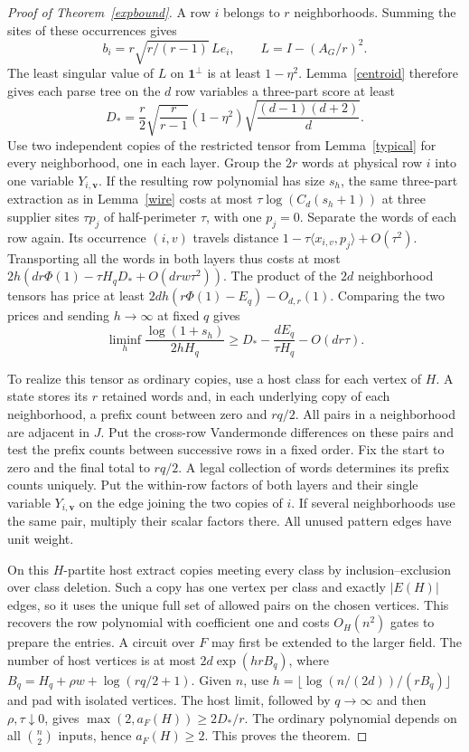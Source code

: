 \documentclass[11pt]{article}
\theoremstyle{remark}
\begin{document}
\begin{proof}[Proof of Theorem~\ref{expbound}]
A row $i$ belongs to $r$ neighborhoods. Summing the sites of these occurrences gives
\[
 b_i=r\sqrt{r/(r-1)}\,L e_i,\qquad L=I-(A_G/r)^2.
\]
The least singular value of $L$ on $\mathbf1^\perp$ is at least $1-\eta^2$. Lemma~\ref{centroid} therefore gives each parse tree on the $d$ row variables a three-part score at least
\[
 D_* = \frac r2\sqrt{\frac r{r-1}}(1-\eta^2)
                      \sqrt{\frac{(d-1)(d+2)}d}.
\]
Use two independent copies of the restricted tensor from Lemma~\ref{typical} for every neighborhood, one in each layer. Group the $2r$ words at physical row $i$ into one variable $Y_{i,\boldsymbol v}$. If the resulting row polynomial has size $s_h$, the same three-part extraction as in Lemma~\ref{wire} costs at most $\tau\log(C_d(s_h+1))$ at three supplier sites $\tau p_j$ of half-perimeter $\tau$, with one $p_j=0$. Separate the words of each row again. Its occurrence $(i,v)$ travels distance $1-\tau\langle x_{i,v},p_j\rangle+O(\tau^2)$. Transporting all the words in both layers thus costs at most $2h(dr\Phi(1)-\tau H_qD_*+O(dr w\tau^2))$. The product of the $2d$ neighborhood tensors has price at least $2dh(r\Phi(1)-E_q)-O_{d,r}(1)$. Comparing the two prices and sending $h\to\infty$ at fixed $q$ gives
\[
 \liminf_h\frac{\log(1+s_h)}{2hH_q}
       \ge D_*-\frac{dE_q}{\tau H_q}-O(dr\tau).
\]

To realize this tensor as ordinary copies, use a host class for each vertex of $H$. A state stores its $r$ retained words and, in each underlying copy of each neighborhood, a prefix count between zero and $rq/2$. All pairs in a neighborhood are adjacent in $J$. Put the cross-row Vandermonde differences on these pairs and test the prefix counts between successive rows in a fixed order. Fix the start to zero and the final total to $rq/2$. A legal collection of words determines its prefix counts uniquely. Put the within-row factors of both layers and their single variable $Y_{i,\boldsymbol v}$ on the edge joining the two copies of $i$. If several neighborhoods use the same pair, multiply their scalar factors there. All unused pattern edges have unit weight.

On this $H$-partite host extract copies meeting every class by inclusion--exclusion over class deletion. Such a copy has one vertex per class and exactly $|E(H)|$ edges, so it uses the unique full set of allowed pairs on the chosen vertices. This recovers the row polynomial with coefficient one and costs $O_H(n^2)$ gates to prepare the entries. A circuit over $F$ may first be extended to the larger field. The number of host vertices is at most $2d\exp(hr B_q)$, where $B_q=H_q+\rho w+\log(rq/2+1)$. Given $n$, use $h=\lfloor\log(n/(2d))/(r B_q)\rfloor$ and pad with isolated vertices. The host limit, followed by $q\to\infty$ and then $\rho,\tau\downarrow0$, gives $\max(2,a_F(H))\ge 2D_*/r$. The ordinary polynomial depends on all $\binom n2$ inputs, hence $a_F(H)\ge2$. This proves the theorem.
\end{proof}
\end{document}

